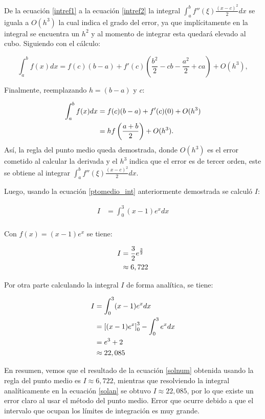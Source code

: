 \documentclass[../portafolio.tex]{subfiles}
\begin{document}
De la ecuación \ref{intref1} a la ecuación \ref{intref2} la integral $\int_a ^bf''(\xi)\frac{(x-c)^2}{2}dx$ se iguala a $ O(h^3)$ la cual indica el grado del error, ya que implícitamente en la integral se encuentra un $h^2$ y al momento de integrar esta quedará elevado al cubo. Siguiendo con el cálculo:

\begin{equation*}
      \int_a ^b f(x) dx  = f(c)(b-a) + f'(c)\left(\frac{b^2}{2}-cb-\frac{a^2}{2}+ca\right)+O(h^3),
\end{equation*}

Finalmente, reemplazando $h=(b-a)$ y $c$:

\begin{align}
    \int_a ^b f(x) dx &=  f(c)(b-a) + f'(c) (0) + O(h^3) \notag \\
         &=  hf\left(\frac{a+b}{2}\right) +O(h^3). \label{ptomedio_int}
\end{align}
Así, la regla del punto medio queda demostrada, donde $O(h^3)$ es el error cometido al calcular la derivada y el $h^3$ indica que el error es de tercer orden, este se obtiene al integrar $\int_a ^bf''(\xi)\frac{(x-c)^2}{2}dx$.

\vspace{2mm}

Luego, usando la ecuación \ref{ptomedio_int} anteriormente demostrada se calculó $I$:

\begin{align*}
    I &= \int_0 ^3 (x-1) e^x dx \\
\end{align*}

Con $f(x)=(x-1)e^x$ se tiene:

\begin{align}
    I &=\frac{3}{2}e^\frac{3}{2} \notag\\
    &\approx 6,722 \label{solnum}
\end{align}

Por otra parte calculando la integral $I$ de forma analítica, se tiene:

\begin{align}
    I &= \int_0 ^3 (x-1) e^x dx \notag \\
    &= \left[ (x-1) e^x \right]_0 ^3 - \int_0 ^3 e^xdx \notag \\
    &= e^3 + 2 \notag \\
    &\approx 22,085 \label{solan}
\end{align}

En resumen, vemos que el resultado de la ecuación \ref{solnum} obtenida usando la regla del punto medio es $I\approx 6,722$,
mientras que resolviendo la integral analíticamente en la ecuación \ref{solan} se obtuvo $I \approx 22,085 $, por lo que existe un error claro al usar el método del punto medio. Error que ocurre debido a que el intervalo que ocupan los límites de integración es muy grande.
\end{document}
